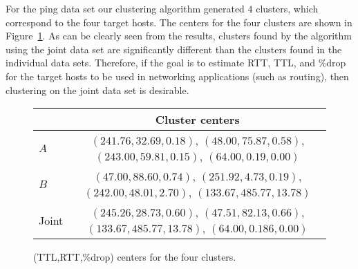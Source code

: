 For the ping data set our clustering algorithm generated $4$ clusters,
which correspond to the four target hosts. The centers for the four
clusters are shown in Figure~\ref{fig:clusters}. As can be clearly
seen from the results, clusters found by the algorithm using the joint
data set are significantly different than the clusters found in the
individual data sets. Therefore, if the goal is to estimate RTT, TTL,
and \%drop for the target hosts to be used in networking applications
(such as routing), then clustering on the joint data set is desirable.

\begin{figure}
\begin{center}
\begin{tabular}{|l|c|} \hline
  & Cluster centers \\ \hline
$A$ &  {\small $(241.76,32.69,0.18)$, $(48.00,75.87,0.58)$, $(243.00,59.81,0.15)$, $(64.00,0.19,0.00)$}\\ \hline
$B$ &  {\small $(47.00,88.60,0.74)$, $(251.92,4.73,0.19)$, $(242.00,48.01,2.70)$, $(133.67,485.77,13.78)$}\\ \hline
Joint & {\small $(245.26,28.73,0.60)$, $(47.51,82.13,0.66)$, $(133.67,485.77,13.78)$, $(64.00,0.186,0.00)$}  \\ \hline
\end{tabular}
\end{center}
\caption{(TTL,RTT,\%drop) centers for the four clusters.}
\label{fig:clusters}
\end{figure}
